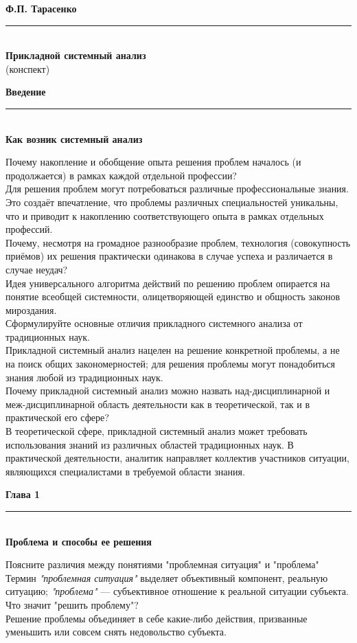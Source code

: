 \documentclass{article}
\newcommand{\note}[1]{\textit{#1}}
\renewcommand{\section}[2]{
	\vspace{5em}
	\begin{flushright}
	\Large
	\baselineskip=0.5\baselineskip
	\textbf{#1}
	\\
	\rule[0.5\baselineskip]{\textwidth}{0.15pt}
	\\
	\textbf{#2}
	\end{flushright}
	}
\renewcommand{\title}[2]{
	\begin{center}
		\LARGE
		\baselineskip=0.5\baselineskip
		\textbf{#1}
		\\
		\rule[0.5\baselineskip]{0.7\textwidth}{0.15pt}
		\\
		\textbf{#2}
		\\\baselineskip=2\baselineskip(конспект)		
	\end{center}
	}
\begin{document}
\title{Ф.П. Тарасенко}{Прикладной системный анализ}
\section{Введение}{Как возник системный анализ}
Почему накопление и обобщение опыта решения проблем началось (и продолжается) в рамках каждой отдельной профессии?
\\
Для решения проблем могут потребоваться различные профессиональные знания. Это создаёт впечатление, что проблемы различных специальностей уникальны, что и приводит к накоплению соответствующего опыта в рамках отдельных профессий.
\\
Почему, несмотря на громадное разнообразие проблем, технология (совокупность приёмов) их решения практически одинакова в случае успеха и различается в случае неудач?
\\
Идея универсального алгоритма действий по решению проблем опирается на понятие всеобщей системности, олицетворяющей единство и общность законов мироздания.
\\
Сформулируйте основные отличия прикладного системного анализа от традиционных наук.
\\
Прикладной системный анализ нацелен на решение конкретной проблемы, а не на поиск общих закономерностей; для решения проблемы могут понадобиться знания любой из традиционных наук.
\\
Почему прикладной системный анализ можно назвать над-дисциплинарной и меж-дисциплинарной область деятельности как в теоретической, так и в практической его сфере?
\\
В теоретической сфере, прикладной системный анализ может требовать использования знаний из различных областей традиционных наук. В практической деятельности, аналитик направляет коллектив участников ситуации, являющихся специалистами в требуемой области знания.
\section{Глава 1}{Проблема и способы ее решения}
Поясните различия между понятиями "проблемная ситуация" и "проблема"
\\
Термин \note{"проблемная ситуация"} выделяет объективный компонент, реальную ситуацию; \note{"проблема"} --- субъективное отношение к реальной ситуации субъекта.
\\
Что значит "решить проблему"?
\\
Решение проблемы объединяет в себе какие-либо действия, призванные уменьшить или совсем снять недовольство субъекта.
\end{document}
